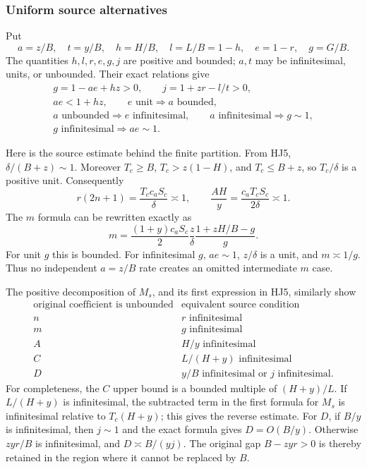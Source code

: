 \subsubsection*{Uniform source alternatives}

Put
\[
 a=z/B,\quad t=y/B,\quad h=H/B,\quad l=L/B=1-h,\quad
 e=1-r,\quad g=G/B.
 \tag{HJ9}
\]
The quantities \(h,l,r,e,g,j\) are positive and bounded;
\(a,t\) may be infinitesimal, units, or unbounded.
Their exact relations give
\[
\begin{gathered}
 g=1-ae+hz>0,\qquad j=1+zr-l/t>0,\\
 ae<1+hz,\qquad
 e\text{ unit}\Longrightarrow a\text{ bounded},\\
 a\text{ unbounded}\Longrightarrow e\text{ infinitesimal},
 \qquad a\text{ infinitesimal}\Longrightarrow g\sim1,\\
 g\text{ infinitesimal}\Longrightarrow ae\sim1.
\end{gathered}
\tag{HJ10}
\]

Here is the source estimate behind the finite partition.
From HJ5,
\(\delta/(B+z)\sim1\).
Moreover \(T_c\geq B\), \(T_c>z(1-H)\), and
\(T_c\leq B+z\), so \(T_c/\delta\) is a positive unit.
Consequently
\[
 r(2n+1)=\frac{T_cc_aS_c}{\delta}\asymp1,\qquad
 \frac{AH}{y}=\frac{c_aT_cS_c}{2\delta}\asymp1.
 \tag{HJ11}
\]
The \(m\) formula can be rewritten exactly as
\[
 m=\frac{(1+y)c_aS_c}{2}\frac z\delta
               \frac{1+zH/B-g}{g}.
 \tag{HJ12}
\]
For unit \(g\) this is bounded.  For infinitesimal \(g\),
\(ae\sim1\), \(z/\delta\) is a unit, and \(m\asymp1/g\).
Thus no independent \(a=z/B\) rate creates an omitted
intermediate \(m\) case.

The positive decomposition of \(M_s\), and its first
expression in HJ5, similarly show
\[
\begin{array}{c|c}
 \text{original coefficient is unbounded}
       &\text{equivalent source condition}\\ \hline
 n&r\text{ infinitesimal}\\
 m&g\text{ infinitesimal}\\
 A&H/y\text{ infinitesimal}\\
 C&L/(H+y)\text{ infinitesimal}\\
 D&y/B\text{ infinitesimal or }j\text{ infinitesimal}.
\end{array}
\tag{HJ13}
\]
For completeness, the \(C\) upper bound is a bounded
multiple of \((H+y)/L\).
If \(L/(H+y)\) is infinitesimal, the subtracted
term in the first formula for \(M_s\) is
infinitesimal relative to \(T_c(H+y)\);
this gives the reverse estimate.
For \(D\), if \(B/y\) is infinitesimal, then
\(j\sim1\) and the exact formula gives \(D=O(B/y)\).
Otherwise \(zyr/B\) is infinitesimal, and
\(D\asymp B/(yj)\).
The original gap \(B-zyr>0\) is thereby retained in
the region where it cannot be replaced by \(B\).

